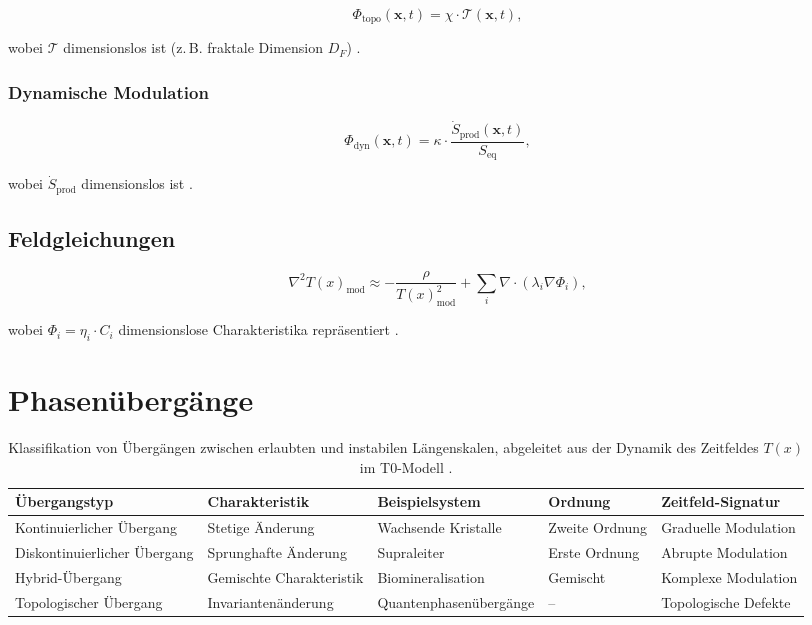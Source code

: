 \documentclass[12pt,a4paper]{article}
\newcommand{\Tfield}{T(x)}
\begin{document}
	\begin{equation}
		\Phi_{\text{topo}}(\mathbf{x}, t) = \chi \cdot \mathcal{T}(\mathbf{x}, t),
	\end{equation}
	
	wobei $\mathcal{T}$ dimensionslos ist (z.\,B. fraktale Dimension $D_F$) \cite{pascher_nateinheiten_2025}.
	
	\subsubsection{Dynamische Modulation}
	
	\begin{equation}
		\Phi_{\text{dyn}}(\mathbf{x}, t) = \kappa \cdot \frac{\dot{S}_{\text{prod}}(\mathbf{x}, t)}{S_{\text{eq}}},
	\end{equation}
	
	wobei $\dot{S}_{\text{prod}}$ dimensionslos ist \cite{pascher_nateinheiten_2025}.
	
	\subsection{Feldgleichungen}
	
	\begin{equation}
		\nabla^2\Tfield_{\text{mod}} \approx -\frac{\rho}{\Tfield_{\text{mod}}^2} + \sum_i \nabla \cdot \left( \lambda_i \nabla \Phi_i \right),
	\end{equation}
	
	wobei $\Phi_i = \eta_i \cdot C_i$ dimensionslose Charakteristika repräsentiert \cite{pascher_nateinheiten_2025}.
	
	\section{Phasenübergänge}
	
	\begin{table}[h]
		\centering
		\begin{adjustbox}{scale=0.7}
			\begin{tabular}{lllll}
				\hline
				\textbf{Übergangstyp} & \textbf{Charakteristik} & \textbf{Beispielsystem} & \textbf{Ordnung} & \textbf{Zeitfeld-Signatur} \\
				\hline
				Kontinuierlicher Übergang & Stetige Änderung & Wachsende Kristalle & Zweite Ordnung & Graduelle Modulation \\
				Diskontinuierlicher Übergang & Sprunghafte Änderung & Supraleiter & Erste Ordnung & Abrupte Modulation \\
				Hybrid-Übergang & Gemischte Charakteristik & Biomineralisation & Gemischt & Komplexe Modulation \\
				Topologischer Übergang & Invariantenänderung & Quantenphasenübergänge & – & Topologische Defekte \\
				\hline
			\end{tabular}
		\end{adjustbox}
		\caption{Klassifikation von Übergängen zwischen erlaubten und instabilen Längenskalen, abgeleitet aus der Dynamik des Zeitfeldes $\Tfield$ im T0-Modell \cite{pascher_nateinheiten_2025}.}
		\label{tab:transitions}
	\end{table}
	
\end{document}
